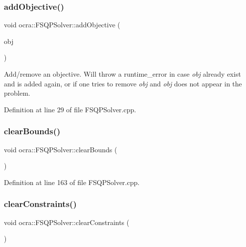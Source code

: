 \subsubsection{\texorpdfstring{add\+Objective()}{addObjective()}}
{\footnotesize\ttfamily void ocra\+::\+F\+S\+Q\+P\+Solver\+::add\+Objective (\begin{DoxyParamCaption}\item[{\hyperlink{namespaceocra_a37a91885f4fa5c523d22cb15d5673062}{Generic\+Objective} \&}]{obj }\end{DoxyParamCaption})}

Add/remove an objective. Will throw a runtime\+\_\+error in case {\itshape obj} already exist and is added again, or if one tries to remove {\itshape obj} and {\itshape obj} does not appear in the problem. 

Definition at line 29 of file F\+S\+Q\+P\+Solver.\+cpp.

\hypertarget{classocra_1_1FSQPSolver_abf1583232819707717f59a6d26604d48}{}\label{classocra_1_1FSQPSolver_abf1583232819707717f59a6d26604d48} 
\subsubsection{\texorpdfstring{clear\+Bounds()}{clearBounds()}}
{\footnotesize\ttfamily void ocra\+::\+F\+S\+Q\+P\+Solver\+::clear\+Bounds (\begin{DoxyParamCaption}{ }\end{DoxyParamCaption})}



Definition at line 163 of file F\+S\+Q\+P\+Solver.\+cpp.

\hypertarget{classocra_1_1FSQPSolver_ad74bdd1aa05a475e0d6b5895541ed55e}{}\label{classocra_1_1FSQPSolver_ad74bdd1aa05a475e0d6b5895541ed55e} 
\subsubsection{\texorpdfstring{clear\+Constraints()}{clearConstraints()}}
{\footnotesize\ttfamily void ocra\+::\+F\+S\+Q\+P\+Solver\+::clear\+Constraints (\begin{DoxyParamCaption}{ }\end{DoxyParamCaption})}



